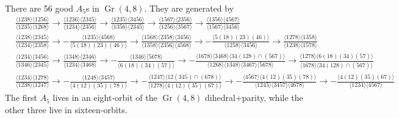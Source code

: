 \documentclass[11pt]{article}
\DeclareMathOperator{\Gr}{Gr}
\begin{document}
There are 56 good $A_5$s in $\Gr(4,8)$. They are generated by
\begin{align}
	&\frac{\langle 1238\rangle  \langle 1256\rangle }{\langle
   1235\rangle  \langle 1268\rangle }\to \frac{\langle
   1236\rangle  \langle 2345\rangle }{\langle 1234\rangle
    \langle 2356\rangle }\to \frac{\langle 1235\rangle 
   \langle 3456\rangle }{\langle 1356\rangle  \langle
   2345\rangle }\to \frac{\langle 1567\rangle  \langle
   2356\rangle }{\langle 1256\rangle  \langle 3567\rangle
   }\to \frac{\langle 1356\rangle  \langle 4567\rangle
   }{\langle 1567\rangle  \langle 3456\rangle }\\
   &\frac{\langle 1238\rangle  \langle 2345\rangle
   }{\langle 1234\rangle  \langle 2358\rangle
   }\to-\frac{\langle 1235\rangle  \langle 4568\rangle
   }{\langle 5(18)(23)(46)\rangle }\to\frac{\langle
   1568\rangle  \langle 2358\rangle  \langle 3456\rangle
   }{\langle 1358\rangle  \langle 2356\rangle  \langle
   4568\rangle }\to-\frac{\langle 5(18)(23)(46)\rangle
   }{\langle 1258\rangle  \langle 3456\rangle
   }\to\frac{\langle 1278\rangle  \langle 1358\rangle
   }{\langle 1238\rangle  \langle 1578\rangle }\\
   &\frac{\langle 1234\rangle  \langle 3456\rangle
   }{\langle 1346\rangle  \langle 2345\rangle
   }\to\frac{\langle 1348\rangle  \langle 2346\rangle
   }{\langle 1234\rangle  \langle 3468\rangle
   }\to-\frac{\langle 1346\rangle  \langle 5678\rangle
   }{\langle 6(18)(34)(57)\rangle }\to-\frac{\langle
   1678\rangle  \langle 3468\rangle  \langle 34(128)\cap
   (567)\rangle }{\langle 1268\rangle  \langle
   1348\rangle  \langle 3467\rangle  \langle 5678\rangle
   }\to\frac{\langle 1278\rangle  \langle
   6(18)(34)(57)\rangle }{\langle 1678\rangle  \langle
   34(128)\cap (567)\rangle }\\
   &\frac{\langle 1234\rangle  \langle 1278\rangle
   }{\langle 1238\rangle  \langle 1247\rangle
   }\to-\frac{\langle 1248\rangle  \langle 3457\rangle
   }{\langle 4(12)(35)(78)\rangle }\to-\frac{\langle
   1247\rangle  \langle 12(345)\cap (678)\rangle
   }{\langle 1278\rangle  \langle 4(12)(35)(67)\rangle
   }\to-\frac{\langle 4567\rangle  \langle
   4(12)(35)(78)\rangle }{\langle 1245\rangle  \langle
   3457\rangle  \langle 4678\rangle }\to-\frac{\langle
   4(12)(35)(67)\rangle }{\langle 1234\rangle  \langle
   4567\rangle }
\end{align}
The first $A_5$ lives in an eight-orbit of the $\Gr(4,8)$ dihedral+parity, while the other three live in sixteen-orbits. 
\end{document}
